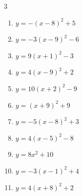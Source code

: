\begin{multicols}{3}
\begin{enumerate}
        \phantom{$\displaystyle 頂点\left( 6 , 5 \right)$}

  \item $\displaystyle y=-\left( x-8\right)^{2}+5$

        \phantom{$\displaystyle 頂点\left( 8 , 5 \right)$}

\columnbreak %

  \item $\displaystyle y=-3\left( x-9\right)^{2}-6$

        \phantom{$\displaystyle 頂点\left( 9 , -6 \right)$}

  \item $\displaystyle y=9\left( x+1\right)^{2}-3$

        \phantom{$\displaystyle 頂点\left( -1 , -3 \right)$}

  \item $\displaystyle y=4\left( x-9\right)^{2}+2$

        \phantom{$\displaystyle 頂点\left( 9 , 2 \right)$}

  \item $\displaystyle y=10\left( x+2\right)^{2}-9$

        \phantom{$\displaystyle 頂点\left( -2 , -9 \right)$}

  \item $\displaystyle y=\left( x+9\right)^{2}+9$

        \phantom{$\displaystyle 頂点\left( -9 , 9 \right)$}

  \item $\displaystyle y=-5\left( x-8\right)^{2}+3$

        \phantom{$\displaystyle 頂点\left( 8 , 3 \right)$}

  \item $\displaystyle y=4\left( x-5\right)^{2}-8$

        \phantom{$\displaystyle 頂点\left( 5 , -8 \right)$}

  \item $\displaystyle y=8x^{2}+10$

        \phantom{$\displaystyle 頂点\left( 0 , 10 \right)$}

  \item $\displaystyle y=-3\left( x-1\right)^{2}+4$

        \phantom{$\displaystyle 頂点\left( 1 , 4 \right)$}

  \item $\displaystyle y=4\left( x+8\right)^{2}+2$


\end{enumerate}
\end{multicols}
